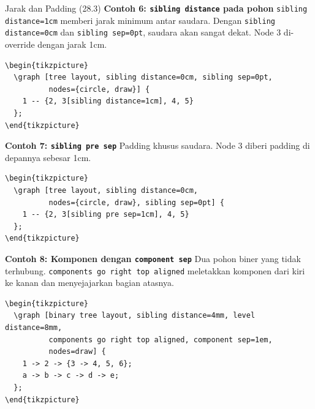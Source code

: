 \documentclass[aspectratio=169]{beamer}
\begin{document}
\begin{frame}{Jarak dan Padding (28.3)}
\textbf{Contoh 6: \texttt{sibling distance} pada pohon}
\texttt{sibling distance=1cm} memberi jarak minimum antar saudara. Dengan \texttt{sibling distance=0cm} dan \texttt{sibling sep=0pt}, saudara akan sangat dekat. Node 3 di-override dengan jarak 1cm.
\begin{lstlisting}
\begin{tikzpicture}
  \graph [tree layout, sibling distance=0cm, sibling sep=0pt,
          nodes={circle, draw}] {
    1 -- {2, 3[sibling distance=1cm], 4, 5}
  };
\end{tikzpicture}
\end{lstlisting}
\begin{center}\end{center}


\textbf{Contoh 7: \texttt{sibling pre sep}}
Padding khusus saudara. Node 3 diberi padding di depannya sebesar 1cm.
\begin{lstlisting}
\begin{tikzpicture}
  \graph [tree layout, sibling distance=0cm,
          nodes={circle, draw}, sibling sep=0pt] {
    1 -- {2, 3[sibling pre sep=1cm], 4, 5}
  };
\end{tikzpicture}
\end{lstlisting}
\begin{center}\end{center}


\textbf{Contoh 8: Komponen dengan \texttt{component sep}}
Dua pohon biner yang tidak terhubung. \texttt{components go right top aligned} meletakkan komponen dari kiri ke kanan dan menyejajarkan bagian atasnya.
\begin{lstlisting}
\begin{tikzpicture}
  \graph [binary tree layout, sibling distance=4mm, level distance=8mm,
          components go right top aligned, component sep=1em,
          nodes=draw] {
    1 -> 2 -> {3 -> 4, 5, 6};
    a -> b -> c -> d -> e;
  };
\end{tikzpicture}
\end{lstlisting}
\begin{center}\end{center}


\end{frame}
\end{document}
